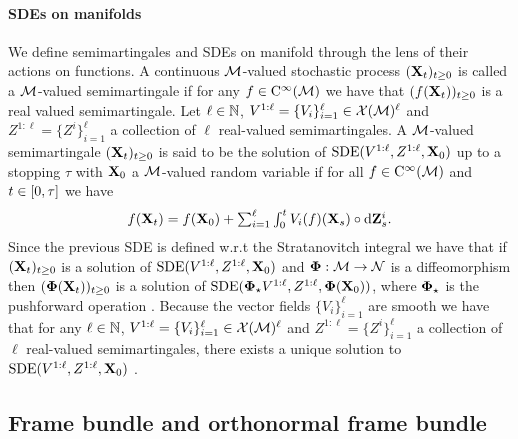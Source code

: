 \paragraph{SDEs on manifolds}
We define semimartingales and SDEs on manifold through the lens of their actions
on functions. A continuous $\mathcal M$-valued stochastic process $(\mathbf{X}_t)_{t \geq 0}$
is called a $\mathcal M$-valued semimartingale if for any $f \in \mathrm{C}^\infty(\mathcal M)$ we
have that $(f(\mathbf{X}_t))_{t \geq 0}$ is a real valued semimartingale. Let
$\ell \in \mathbb{N}$, $V^{1:\ell} = \{ V_i\}_{i=1}^\ell \in \mathcal{X}(\mathcal{M})^\ell$ and
$Z^{1:\ell} = \{Z^i\}_{i=1}^\ell$ a collection of $\ell$ real-valued
semimartingales. A $\mathcal M$-valued semimartingale $(\mathbf{X}_t)_{t \geq 0}$ is said to
be the solution of $\mathrm{SDE}(V^{1:\ell}, Z^{1:\ell}, \mathbf{X}_0)$ up to a stopping
$\tau$ with $\mathbf{X}_0$ a $\mathcal M$-valued random variable if for all
$f \in \mathrm{C}^\infty(\mathcal M)$ and $t \in \left[0, \tau\right]$ we have 
\begin{equation}
  \textstyle{f(\mathbf{X}_t) = f(\mathbf{X}_0) + \sum_{i=1}^\ell \int_0^t V_i(f)(\mathbf{X}_s) \circ \mathrm{d}\mathbf{Z}^i_s  . } 
\end{equation}
Since the previous SDE is defined w.r.t the Stratanovitch integral we have that
if $(\mathbf{X}_t)_{t \geq 0}$ is a solution of $\mathrm{SDE}(V^{1:\ell}, Z^{1:\ell}, \mathbf{X}_0)$
and $\mathbf{\Phi}: \mathcal M \to \mathcal{N}$ is a diffeomorphism then $(\mathbf{\Phi}(\mathbf{X}_t))_{t \geq 0}$
is a solution of $\mathrm{SDE}(\mathbf{\Phi}_\star V^{1:\ell}, Z^{1:\ell}, \mathbf{\Phi}(\mathbf{X}_0))$,
where $\mathbf{\Phi}_\star$ is the pushforward operation \cite[see][Proposition
1.2.4]{hsu2002stochastic}. Because the vector fields $\{V_i\}_{i=1}^\ell$ are
smooth we have that for any $\ell \in \mathbb{N}$,
$V^{1:\ell} = \{ V_i\}_{i=1}^\ell \in \mathcal{X}(\mathcal{M})^\ell$ and
$Z^{1:\ell} = \{Z^i\}_{i=1}^\ell$ a collection of $\ell$ real-valued
semimartingales, there exists a unique solution to
$\mathrm{SDE}(V^{1:\ell}, Z^{1:\ell}, \mathbf{X}_0)$ \cite[see][Theorem
1.2.9]{hsu2002stochastic}.


\subsection{Frame bundle and orthonormal frame bundle}
\label{sec:frame-bundle-orth}

